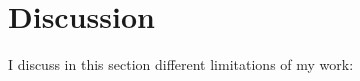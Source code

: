 

\section{Discussion}\label{sec:discussion}

I discuss in this section different limitations of my work:

